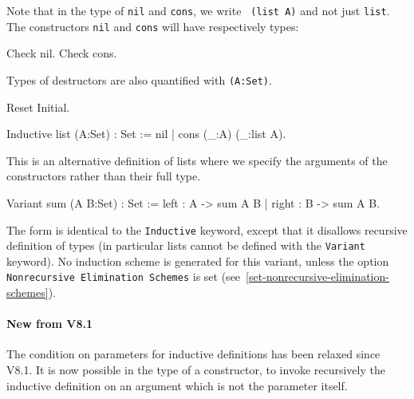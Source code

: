 Note that in the type of {\tt nil} and {\tt cons}, we write {\tt
  (list A)} and not just {\tt list}.\\ The constructors {\tt nil} and
{\tt cons} will have respectively types:

\begin{coq_example}
Check nil.
Check cons.
\end{coq_example}

Types of destructors are also quantified with {\tt (A:Set)}.

\begin{coq_eval}
Reset Initial.
\end{coq_eval}
\begin{Variants}
\item
\begin{coq_example*}
Inductive list (A:Set) : Set := nil | cons (_:A) (_:list A).
\end{coq_example*}
This is an alternative definition of lists where we specify the
arguments of the constructors rather than their full type.
\item
\begin{coq_example*}
Variant sum (A B:Set) : Set := left : A -> sum A B | right : B -> sum A B.
\end{coq_example*}
The 
form is identical to the {\tt Inductive} keyword,
except that it disallows recursive definition of types (in particular
lists cannot be defined with the {\tt Variant} keyword). No induction
scheme is generated for this variant, unless the option
{\tt Nonrecursive Elimination Schemes} is set
(see~\ref{set-nonrecursive-elimination-schemes}).
\end{Variants}

\begin{ErrMsgs}
\item {}
\end{ErrMsgs}

\paragraph{New from \Coq{} V8.1} The condition on parameters for
inductive definitions has been relaxed since \Coq{} V8.1. It is now
possible in the type of a constructor, to invoke recursively the
inductive definition on an argument which is not the parameter itself.

